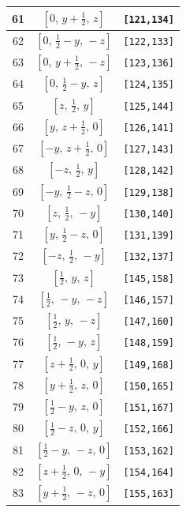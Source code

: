 \documentclass[fleqn,8pt]{jsarticle}
\begin{document}
\begin{longtable}{ccc}
61 & $\left[ 0,\, y + \frac{1}{2},\, z \right]$ & {\tt [121,134]} \\ \hline
62 & $\left[ 0,\, \frac{1}{2} - y,\, - z \right]$ & {\tt [122,133]} \\ \hline
63 & $\left[ 0,\, y + \frac{1}{2},\, - z \right]$ & {\tt [123,136]} \\ \hline
64 & $\left[ 0,\, \frac{1}{2} - y,\, z \right]$ & {\tt [124,135]} \\ \hline
65 & $\left[ z,\, \frac{1}{2},\, y \right]$ & {\tt [125,144]} \\ \hline
66 & $\left[ y,\, z + \frac{1}{2},\, 0 \right]$ & {\tt [126,141]} \\ \hline
67 & $\left[ - y,\, z + \frac{1}{2},\, 0 \right]$ & {\tt [127,143]} \\ \hline
68 & $\left[ - z,\, \frac{1}{2},\, y \right]$ & {\tt [128,142]} \\ \hline
69 & $\left[ - y,\, \frac{1}{2} - z,\, 0 \right]$ & {\tt [129,138]} \\ \hline
70 & $\left[ z,\, \frac{1}{2},\, - y \right]$ & {\tt [130,140]} \\ \hline
71 & $\left[ y,\, \frac{1}{2} - z,\, 0 \right]$ & {\tt [131,139]} \\ \hline
72 & $\left[ - z,\, \frac{1}{2},\, - y \right]$ & {\tt [132,137]} \\ \hline
73 & $\left[ \frac{1}{2},\, y,\, z \right]$ & {\tt [145,158]} \\ \hline
74 & $\left[ \frac{1}{2},\, - y,\, - z \right]$ & {\tt [146,157]} \\ \hline
75 & $\left[ \frac{1}{2},\, y,\, - z \right]$ & {\tt [147,160]} \\ \hline
76 & $\left[ \frac{1}{2},\, - y,\, z \right]$ & {\tt [148,159]} \\ \hline
77 & $\left[ z + \frac{1}{2},\, 0,\, y \right]$ & {\tt [149,168]} \\ \hline
78 & $\left[ y + \frac{1}{2},\, z,\, 0 \right]$ & {\tt [150,165]} \\ \hline
79 & $\left[ \frac{1}{2} - y,\, z,\, 0 \right]$ & {\tt [151,167]} \\ \hline
80 & $\left[ \frac{1}{2} - z,\, 0,\, y \right]$ & {\tt [152,166]} \\ \hline
81 & $\left[ \frac{1}{2} - y,\, - z,\, 0 \right]$ & {\tt [153,162]} \\ \hline
82 & $\left[ z + \frac{1}{2},\, 0,\, - y \right]$ & {\tt [154,164]} \\ \hline
83 & $\left[ y + \frac{1}{2},\, - z,\, 0 \right]$ & {\tt [155,163]} \\ \hline

\end{longtable}
\end{document}
